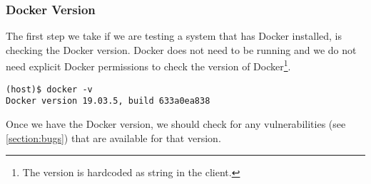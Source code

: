 \subsubsection{Docker Version}
The first step we take if we are testing a system that has Docker installed, is checking the Docker version. Docker does not need to be running and we do not need explicit Docker permissions to check the version of Docker\footnote{The version is hardcoded as string in the client.}.

\begin{lstlisting}[caption={Show Docker version.},captionpos=b]
(host)$ docker -v
Docker version 19.03.5, build 633a0ea838
\end{lstlisting}

Once we have the Docker version, we should check for any vulnerabilities (see \autoref{section:bugs}) that are available for that version.
